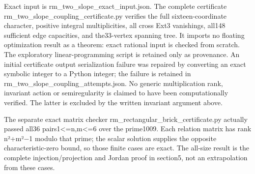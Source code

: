 Exact input is rm\_two\_slope\_exact\_input.json. The complete certificate
rm\_two\_slope\_coupling\_certificate.py verifies the full
sixteen-coordinate character, positive integral multiplicities, all cross
Ext3 vanishings, all148 sufficient edge capacities, and the33-vertex
spanning tree. It imports no floating optimization result as a theorem:
exact rational input is checked from scratch. The exploratory
linear-programming script is retained only as provenance. An initial
certificate output serialization failure was repaired by converting an exact
symbolic integer to a Python integer; the failure is retained in
rm\_two\_slope\_coupling\_attempts.json. No generic multiplication rank,
invariant action or semiregularity is claimed to have been computationally
verified. The latter is excluded by the written invariant argument above.

The separate exact matrix checker rm\_rectangular\_brick\_certificate.py
actually passed all36 pairs1\textless=n,m\textless=6 over the prime1009.
Each relation matrix has rank n²+m²−1 modulo that prime; the scalar solution
supplies the opposite characteristic-zero bound, so those finite cases are
exact. The all-size result is the complete injection/projection and Jordan
proof in section5, not an extrapolation from these cases.
